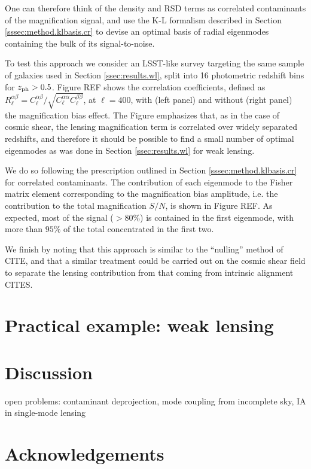 \documentclass[twocolumn,amsfont,amssymb,amsmath, showpacs,balancelastpage, nofootinbib]{revtex4-1}
\begin{document}
    One can therefore think of the density and RSD terms as correlated contaminants of the magnification signal, and use the K-L formalism described in Section \ref{sssec:method.klbasis.cr} to devise an optimal basis of radial eigenmodes containing the bulk of its signal-to-noise.
    
    To test this approach we consider an LSST-like survey targeting the same sample of galaxies used in Section \ref{ssec:results.wl}, split into 16 photometric redshift bins for $z_{\rm ph}>0.5$. Figure REF shows the correlation coefficients, defined as $R^{\alpha\beta}_\ell=C^{\alpha\beta}_\ell/\sqrt{C^{\alpha\alpha}_\ell C^{\beta\beta}_\ell}$, at $\ell=400$, with (left panel) and without (right panel) the magnification bias effect. The Figure emphasizes that, as in the case of cosmic shear, the lensing magnification term is correlated over widely separated redshifts, and therefore it should be possible to find a small number of optimal eigenmodes as was done in Section \ref{ssec:results.wl} for weak lensing.
    
    We do so following the prescription outlined in Section \ref{sssec:method.klbasis.cr} for correlated contaminants. The contribution of each eigenmode to the Fisher matrix element corresponding to the magnification bias amplitude, i.e. the contribution to the total magnification $S/N$, is shown in Figure REF. As expected, most of the signal ($>80\%$) is contained in the first eigenmode, with more than $95\%$ of the total concentrated in the first two.
    
    We finish by noting that this approach is similar to the ``nulling'' method of CITE, and that a similar treatment could be carried out on the cosmic shear field to separate the lensing contribution from that coming from intrinsic alignment CITES.

    
\section{Practical example: weak lensing}
  \lipsum[2]

\section{Discussion}\label{sec:discussion}
  \lipsum[3]
  
  open problems: contaminant deprojection, mode coupling from incomplete sky, IA in single-mode lensing
  
  
\section*{Acknowledgements}
  \lipsum[4]
  
\end{document}
